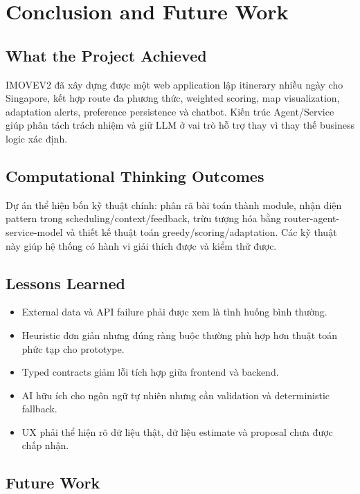 \chapter{Conclusion and Future Work}

\section{What the Project Achieved}

IMOVEV2 đã xây dựng được một web application lập itinerary nhiều ngày cho Singapore, kết hợp route đa phương thức, weighted scoring, map visualization, adaptation alerts, preference persistence và chatbot. Kiến trúc Agent/Service giúp phân tách trách nhiệm và giữ LLM ở vai trò hỗ trợ thay vì thay thế business logic xác định.

\section{Computational Thinking Outcomes}

Dự án thể hiện bốn kỹ thuật chính: phân rã bài toán thành module, nhận diện pattern trong scheduling/context/feedback, trừu tượng hóa bằng router-agent-service-model và thiết kế thuật toán greedy/scoring/adaptation. Các kỹ thuật này giúp hệ thống có hành vi giải thích được và kiểm thử được.

\section{Lessons Learned}

\begin{itemize}
  \item External data và API failure phải được xem là tình huống bình thường.
  \item Heuristic đơn giản nhưng đúng ràng buộc thường phù hợp hơn thuật toán phức tạp cho prototype.
  \item Typed contracts giảm lỗi tích hợp giữa frontend và backend.
  \item AI hữu ích cho ngôn ngữ tự nhiên nhưng cần validation và deterministic fallback.
  \item UX phải thể hiện rõ dữ liệu thật, dữ liệu estimate và proposal chưa được chấp nhận.
\end{itemize}

\section{Future Work}

